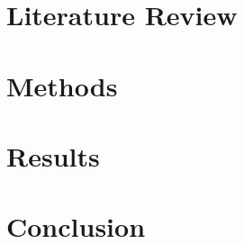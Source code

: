 



\section{Literature Review} \label{sec:p1lr}

\section{Methods}

\section{Results}

\section{Conclusion}
